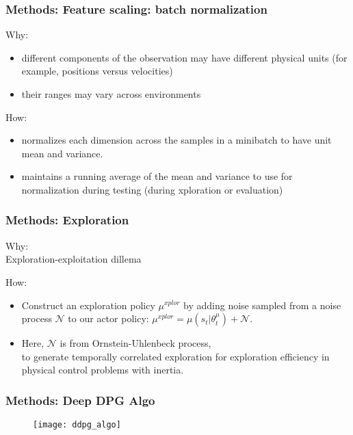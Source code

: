 \begin{frame}
\frametitle{Methods: Feature scaling: batch normalization}
Why:
\begin{itemize}
\item different components of the observation may have different physical units (for example, positions versus velocities)
\item their ranges may vary across environments
\end{itemize}
\vspace{5mm}

How:
\begin{itemize}
\item normalizes each dimension across the samples in a minibatch to have unit mean and variance.
\item maintains a running average of the mean and variance to use for normalization during testing
(during xploration or evaluation)
\end{itemize}

\end{frame}

\begin{frame}
\frametitle{Methods: Exploration}
Why:\\
Exploration-exploitation dillema
\vspace{5mm}

How:\\
\begin{itemize}
\item Construct an exploration policy $\mu^{xplor}$ by adding noise sampled from
a noise process $\mathcal{N}$ to our actor policy:
$\mu^{xplor} = \mu(s_t | \theta^{\mu}_t) + \mathcal{N}$.\\
\item Here, $\mathcal{N}$ is from Ornstein-Uhlenbeck process,\\
to generate temporally correlated exploration for exploration efficiency in physical control problems with inertia.
\end{itemize}
\end{frame}

\begin{frame}
\frametitle{Methods: Deep DPG Algo}
\begin{figure}
    \centering
    \texttt{[image: ddpg\_algo]}
\end{figure}
\end{frame}

